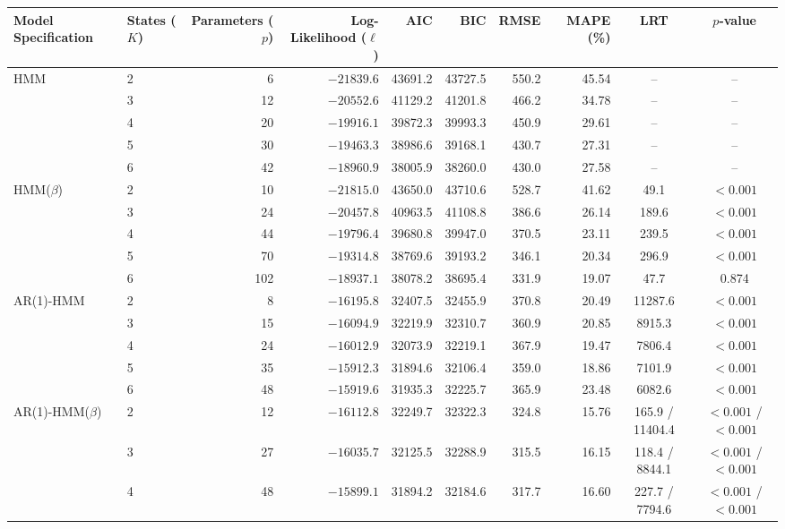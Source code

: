 \begin{table}[ht]
\centering
\begin{adjustbox}{max width=\textwidth}
\begin{tabular}{llrrrrrrcc}
\hline
Model Specification & States ($K$) & Parameters ($p$) & Log-Likelihood ($\ell$) & AIC & BIC & RMSE & MAPE (\%) & LRT & $p$-value \\
\hline
HMM & 2 & 6 & $-21839.6$ & 43691.2 & 43727.5 & 550.2 & 45.54 & -- & -- \\
 & 3 & 12 & $-20552.6$ & 41129.2 & 41201.8 & 466.2 & 34.78 & -- & -- \\
 & 4 & 20 & $-19916.1$ & 39872.3 & 39993.3 & 450.9 & 29.61 & -- & -- \\
 & 5 & 30 & $-19463.3$ & 38986.6 & 39168.1 & 430.7 & 27.31 & -- & -- \\
 & 6 & 42 & $-18960.9$ & 38005.9 & 38260.0 & 430.0 & 27.58 & -- & -- \\
\hline
HMM($\beta$) & 2 & 10 & $-21815.0$ & 43650.0 & 43710.6 & 528.7 & 41.62 & 49.1 & $<0.001$ \\
 & 3 & 24 & $-20457.8$ & 40963.5 & 41108.8 & 386.6 & 26.14 & 189.6 & $<0.001$ \\
 & 4 & 44 & $-19796.4$ & 39680.8 & 39947.0 & 370.5 & 23.11 & 239.5 & $<0.001$ \\
 & 5 & 70 & $-19314.8$ & 38769.6 & 39193.2 & 346.1 & 20.34 & 296.9 & $<0.001$ \\
 & 6 & 102 & $-18937.1$ & 38078.2 & 38695.4 & 331.9 & 19.07 & 47.7 & 0.874 \\
\hline
AR(1)-HMM & 2 & 8 & $-16195.8$ & 32407.5 & 32455.9 & 370.8 & 20.49 & 11287.6 & $<0.001$ \\
 & 3 & 15 & $-16094.9$ & 32219.9 & 32310.7 & 360.9 & 20.85 & 8915.3 & $<0.001$ \\
 & 4 & 24 & $-16012.9$ & 32073.9 & 32219.1 & 367.9 & 19.47 & 7806.4 & $<0.001$ \\
 & 5 & 35 & $-15912.3$ & 31894.6 & 32106.4 & 359.0 & 18.86 & 7101.9 & $<0.001$ \\
 & 6 & 48 & $-15919.6$ & 31935.3 & 32225.7 & 365.9 & 23.48 & 6082.6 & $<0.001$ \\
\hline
AR(1)-HMM($\beta$) & 2 & 12 & $-16112.8$ & 32249.7 & 32322.3 & 324.8 & 15.76 & 165.9 / 11404.4 & $<0.001$ / $<0.001$ \\
 & 3 & 27 & $-16035.7$ & 32125.5 & 32288.9 & 315.5 & 16.15 & 118.4 / 8844.1 & $<0.001$ / $<0.001$ \\
 & 4 & 48 & $-15899.1$ & 31894.2 & 32184.6 & 317.7 & 16.60 & 227.7 / 7794.6 & $<0.001$ / $<0.001$ \\

\end{tabular}
\end{adjustbox}
\end{table}
